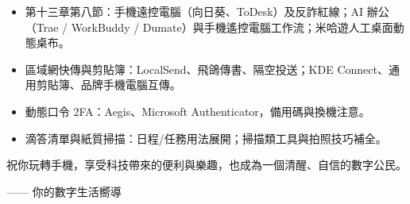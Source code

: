 
\begin{itemize}
  \item 第十三章第八節：手機遠控電腦（向日葵、ToDesk）及反詐紅線；AI 辦公（Trae / WorkBuddy / Dumate）與手機遙控電腦工作流；米哈遊人工桌面動態桌布。
  \item 區域網快傳與剪貼簿：LocalSend、飛鴿傳書、隔空投送；KDE Connect、通用剪貼簿、品牌手機電腦互傳。
  \item 動態口令 2FA：Aegis、Microsoft Authenticator，備用碼與換機注意。
  \item 滴答清單與紙質掃描：日程/任務用法展開；掃描類工具與拍照技巧補全。
\end{itemize}

祝你玩轉手機，享受科技帶來的便利與樂趣，也成為一個清醒、自信的數字公民。

—— 你的數字生活嚮導
